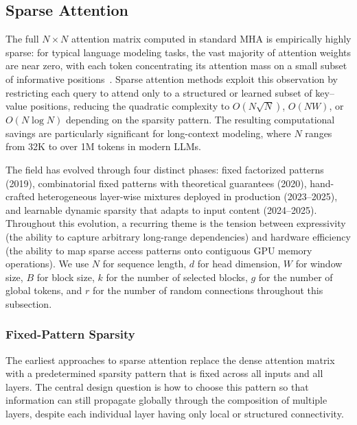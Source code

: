 \subsection{Sparse Attention}
\label{subsec:sparse-attn}

The full $N \times N$ attention matrix computed in standard MHA is empirically highly sparse: for typical language modeling tasks, the vast majority of attention weights are near zero, with each token concentrating its attention mass on a small subset of informative positions~\cite{child2019generating}. Sparse attention methods exploit this observation by restricting each query to attend only to a structured or learned subset of key--value positions, reducing the quadratic complexity to $O(N\sqrt{N})$, $O(NW)$, or $O(N \log N)$ depending on the sparsity pattern. The resulting computational savings are particularly significant for long-context modeling, where $N$ ranges from 32K to over 1M tokens in modern LLMs.

The field has evolved through four distinct phases: fixed factorized patterns (2019), combinatorial fixed patterns with theoretical guarantees (2020), hand-crafted heterogeneous layer-wise mixtures deployed in production (2023--2025), and learnable dynamic sparsity that adapts to input content (2024--2025). Throughout this evolution, a recurring theme is the tension between expressivity (the ability to capture arbitrary long-range dependencies) and hardware efficiency (the ability to map sparse access patterns onto contiguous GPU memory operations). We use $N$ for sequence length, $d$ for head dimension, $W$ for window size, $B$ for block size, $k$ for the number of selected blocks, $g$ for the number of global tokens, and $r$ for the number of random connections throughout this subsection.


\subsubsection{Fixed-Pattern Sparsity}
\label{subsubsec:fixed-pattern}

The earliest approaches to sparse attention replace the dense attention matrix with a predetermined sparsity pattern that is fixed across all inputs and all layers. The central design question is how to choose this pattern so that information can still propagate globally through the composition of multiple layers, despite each individual layer having only local or structured connectivity.

